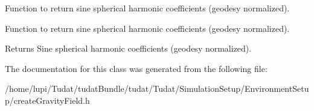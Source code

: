 Function to return sine spherical harmonic coefficients (geodesy normalized). 

Function to return sine spherical harmonic coefficients (geodesy normalized). \begin{DoxyReturn}{Returns}
Sine spherical harmonic coefficients (geodesy normalized). 
\end{DoxyReturn}


The documentation for this class was generated from the following file\+:\begin{DoxyCompactItemize}
\item 
/home/lupi/\+Tudat/tudat\+Bundle/tudat/\+Tudat/\+Simulation\+Setup/\+Environment\+Setup/create\+Gravity\+Field.\+h\end{DoxyCompactItemize}
